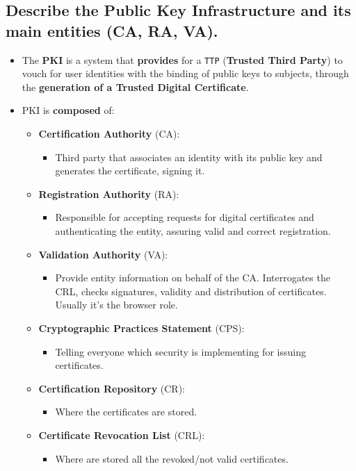 \documentclass[9pt, letterpaper]{article}
\begin{document}
\subsection{Describe the Public Key Infrastructure and its main entities (CA, RA, VA).}
\begin{itemize}
	\item The \textbf{PKI} is a system that \textbf{provides} for a {\tt TTP} (\textbf{Trusted Third Party}) to vouch for user identities with the binding of public keys to subjects, through the \textbf{generation of a Trusted Digital Certificate}.
	\item PKI is \textbf{composed} of:
	\begin{itemize}
		\item \textbf{Certification Authority} (CA): 
		\begin{itemize}
			\item Third party that associates an identity with its public key and generates the certificate, signing it.
		\end{itemize}
		\item \textbf{Registration Authority} (RA): 
		\begin{itemize}
			\item Responsible for accepting requests for digital certificates and authenticating the entity, assuring valid and correct registration.
		\end{itemize}
		\item \textbf{Validation Authority} (VA): 
		\begin{itemize}
			\item Provide entity information on behalf of the CA. Interrogates the CRL, checks signatures, validity and distribution of certificates. Usually it's the browser role.
		\end{itemize}
		\item \textbf{Cryptographic Practices Statement} (CPS): 
		\begin{itemize}
			\item Telling everyone which security is implementing for issuing certificates.
		\end{itemize}
		\item \textbf{Certification Repository} (CR): 
		\begin{itemize}
			\item Where the certificates are stored.
		\end{itemize} 
		\item \textbf{Certificate Revocation List} (CRL): 
		\begin{itemize}
			\item Where are stored all the revoked/not valid certificates.
		\end{itemize} 
	\end{itemize}
\end{itemize}
\end{document}
